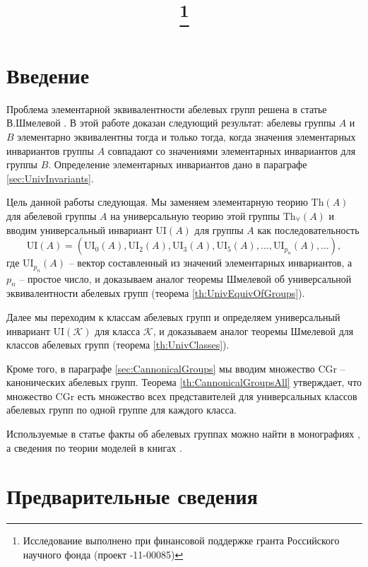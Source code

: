 \documentclass[a4paper,11pt,twoside]{article}
\title{\titles\footnote{Исследование выполнено при финансовой поддержке гранта Российского научного фонда (проект \textnumero14-11-00085)}}
\author{\authors}
\gdef\firstpage{1}
\def\K{{\mathcal{K}}}
\def\Th{{\mathrm{Th}}}
\def\Tha{{\mathrm{Th}_\forall}}
\def\CG{{\mathrm{CGr}}}
\def\ui{{\mathrm{UI}}}
\begin{document}
\maketitle

\tableofcontents
\listoftodos


\setcounter{page}{\firstpage}
\pagestyle{newpstyle}

\Russian
\sloppy
\rm


\section{Введение}

Проблема элементарной эквивалентности абелевых групп решена в статье В.Шмелевой \cite{Szm}. В этой работе доказан следующий результат: абелевы группы $A$ и $B$ элементарно эквивалентны тогда и только тогда, когда значения элементарных инвариантов группы $A$ совпадают со значениями элементарных инвариантов для группы $B$. Определение элементарных инвариантов дано в параграфе \ref{sec:UnivInvariants}.

Цель данной работы следующая. Мы заменяем элементарную теорию $\Th(A)$ для абелевой группы $A$ на универсальную теорию этой группы $\Tha(A)$ и вводим универсальный инвариант $\ui(A)$ для группы $A$ как последовательность 
$$\ui(A) = (\ui_0(A), \ui_2(A), \ui_3(A), \ui_5(A), \ldots, \ui_{p_n}(A), \ldots ),$$
где $\ui_{p_n}(A)$ -- вектор составленный из значений элементарных инвариантов, а $p_n$ -- простое число, и доказываем аналог теоремы Шмелевой об универсальной эквивалентности абелевых групп (теорема \ref{th:UnivEquivOfGroups}).

Далее мы переходим к классам абелевых групп и определяем универсальный инвариант $\ui(\K)$ для класса $\K$, и доказываем аналог теоремы Шмелевой для классов абелевых групп (теорема \ref{th:UnivClasses}).

Кроме того, в параграфе \ref{sec:CannonicalGroups} мы вводим множество $\CG$ -- канонических абелевых групп. Теорема \ref{th:CannonicalGroupsAll} утверждает, что множество $\CG$ есть множество всех представителей для универсальных классов абелевых групп по одной группе для каждого класса. 

Используемые в статье факты об абелевых группах можно найти в монографиях \cite{Fuchs1, Fuchs2}, а сведения по теории моделей в книгах \cite{Ershov, Hodges, DM}.

\section{Предварительные сведения}
\end{document}
